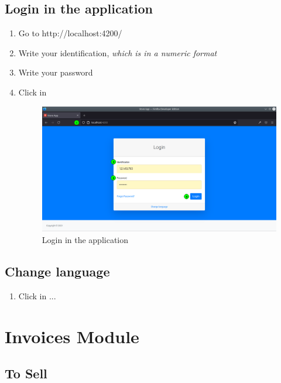 \documentclass[a4paper,11pt]{refart}
\newcommand\SiteRanqhana{\textsf{http://localhost:4200/}}
\begin{document}
\subsection{Login in the application}
\begin{enumerate}
\item Go to \SiteRanqhana
\item Write your identification, \emph{which is in a numeric format}
\item Write your password
\item Click in 
\begin{figure}[H]\centering
	\includegraphics[width=\textwidth]{images/login}
	\caption{Login in the application}\label{fig:login}
\end{figure}
\end{enumerate}	


\subsection{Change language}
\begin{enumerate}
	\item Click in ...
\end{enumerate}	

\section{Invoices Module}

\subsection{To Sell}
\end{document}

